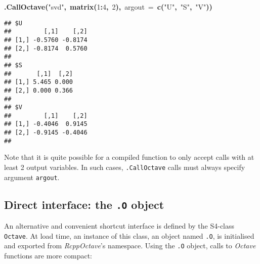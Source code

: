 \documentclass[english,10pt,a4paper]{article}\usepackage{graphicx, color}
\makeatletter
\newcommand{\hlnumber}[1]{\textcolor[rgb]{0,0,0}{#1}}%
\newcommand{\hlfunctioncall}[1]{\textcolor[rgb]{0.501960784313725,0,0.329411764705882}{\textbf{#1}}}%
\newcommand{\hlstring}[1]{\textcolor[rgb]{0.6,0.6,1}{#1}}%
\newcommand{\hlkeyword}[1]{\textcolor[rgb]{0,0,0}{\textbf{#1}}}%
\newcommand{\hlargument}[1]{\textcolor[rgb]{0.690196078431373,0.250980392156863,0.0196078431372549}{#1}}%
\newcommand{\hlstd}[1]{\textcolor[rgb]{0,0,0}{#1}}%
\newenvironment{kframe}{%
 \def\FrameCommand##1{\hskip\@totalleftmargin \hskip-\fboxsep
 \colorbox{shadecolor}{##1}\hskip-\fboxsep
     \hskip-\linewidth \hskip-\@totalleftmargin \hskip\columnwidth}%
 \MakeFramed {\advance\hsize-\width
   \@totalleftmargin\z@ \linewidth\hsize
   \@setminipage}}%
 {\par\unskip\endMakeFramed}
\newenvironment{knitrout}{}{} %
\let\proglang=\textit
\let\code=\texttt
\newcommand{\pkgname}[1]{\textit{#1}\xspace}
\newcommand{\octave}{\proglang{Octave}\xspace}
\makeatother
\begin{document}
\begin{knitrout}
\begin{kframe}
\begin{flushleft}
\hlstd{}\hlfunctioncall{.CallOctave}\hlkeyword{(}\hlstring{"{}svd"{}}\hlkeyword{,}{\ }\hlfunctioncall{matrix}\hlkeyword{(}\hlnumber{1}\hlkeyword{:}\hlnumber{4}\hlkeyword{,}{\ }\hlnumber{2}\hlkeyword{)}\hlkeyword{,}{\ }\hlargument{argout}{\ }\hlargument{=}{\ }\hlfunctioncall{c}\hlkeyword{(}\hlstring{"{}U"{}}\hlkeyword{,}{\ }\hlstring{"{}S"{}}\hlkeyword{,}{\ }\hlstring{"{}V"{}}\hlkeyword{)}\hlkeyword{)}\mbox{}
\normalfont
\end{flushleft}
\begin{verbatim}
## $U
##         [,1]    [,2]
## [1,] -0.5760 -0.8174
## [2,] -0.8174  0.5760
## 
## $S
##       [,1]  [,2]
## [1,] 5.465 0.000
## [2,] 0.000 0.366
## 
## $V
##         [,1]    [,2]
## [1,] -0.4046  0.9145
## [2,] -0.9145 -0.4046
## 
\end{verbatim}
\end{kframe}
\end{knitrout}


Note that it is quite possible for a compiled function to only accept
calls with at least 2 output variables.
In such cases, \code{.CallOctave} calls must always specify argument
\code{argout}.

\subsection{Direct interface: the \texttt{.O} object}

An alternative and convenient shortcut interface is defined by the S4-class
\code{Octave}.
At load time, an instance of this class, an object named \code{.O}, is
initialised and exported from \pkgname{RcppOctave}'s namespace.
Using the \code{.O} object, calls to \octave functions are more compact: 
\end{document}
